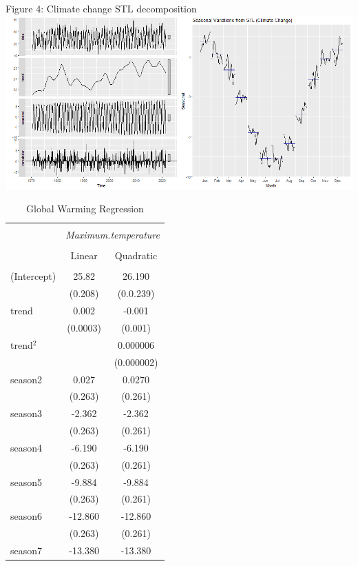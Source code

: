\documentclass[12pt]{article}
\begin{document}
{Figure 4: Climate change STL decomposition\\
\includegraphics[scale=0.5]{CC STL}\\

\begin{table}[H] \centering 
\parbox{.45\linewidth}{
  \caption{Global Warming Regression} 
  \label{} 
\begin{tabular}{@{\extracolsep{5pt}}lcc} 
\\[-1.8ex]\hline 
\hline \\[-1.8ex] 
 & \multicolumn{2}{c}{\textit{Maximum.temperature}} \\ 
\cline{2-3} 
\\[-1.8ex] & Linear & Quadratic \\ 
\hline \\[-1.8ex] 
(Intercept) & 25.82 & 26.190 \\ 
  & (0.208) & (0.0.239) \\ 
trend & 0.002 & -0.001 \\ 
  & (0.0003) & (0.001) \\ 
trend$^2$ &  & 0.000006 \\ 
  &  & (0.000002) \\ 
season2 & 0.027 & 0.0270 \\ 
  & (0.263) & (0.261) \\ 
season3 & -2.362 & -2.362 \\ 
  & (0.263) & (0.261) \\ 
season4 & -6.190 & -6.190 \\ 
  & (0.263) & (0.261) \\ 
season5 & -9.884 & -9.884 \\ 
  & (0.263) & (0.261) \\ 
season6 & -12.860 & -12.860 \\ 
  & (0.263) & (0.261) \\ 
season7 & -13.380 & -13.380 \\ 

\end{tabular}}
\end{table}}
\end{document}

